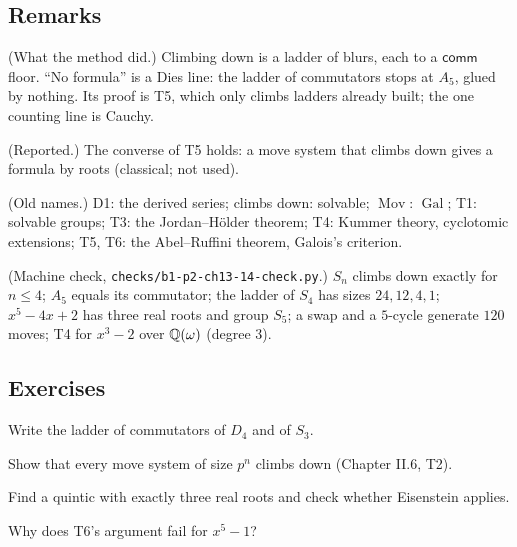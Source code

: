 \subsection*{Remarks}

\begin{lines}
\item[\lab{R1}] (What the method did.) Climbing down is a ladder of blurs, each to a $\mathsf{comm}$ floor. ``No formula'' is a Dies line: the ladder of commutators stops at $A_5$, glued by nothing. Its proof is T5, which only climbs ladders already built; the one counting line is Cauchy.
\item[\lab{R2}] (Reported.) The converse of T5 holds: a move system that climbs down gives a formula by roots (classical; not used).
\item[\lab{R3}] (Old names.) D1: the derived series; climbs down: solvable; $\operatorname{Mov}$: $\operatorname{Gal}$; T1: solvable groups; T3: the Jordan--H\"older theorem; T4: Kummer theory, cyclotomic extensions; T5, T6: the Abel--Ruffini theorem, Galois's criterion.
\item[\lab{R4}] (Machine check, \texttt{checks/b1-p2-ch13-14-check.py}.) $S_n$ climbs down exactly for $n \le 4$; $A_5$ equals its commutator; the ladder of $S_4$ has sizes $24, 12, 4, 1$; $x^5 - 4x + 2$ has three real roots and group $S_5$; a swap and a $5$-cycle generate $120$ moves; T4 for $x^3 - 2$ over $\mathbb{Q}(\omega)$ (degree $3$).
\end{lines}

\subsection*{Exercises}

\begin{lines}
\item[\lab{E1}] Write the ladder of commutators of $D_4$ and of $S_3$.
\item[\lab{E2}] Show that every move system of size $p^n$ climbs down (Chapter II.6, T2).
\item[\lab{E3}] Find a quintic with exactly three real roots and check whether Eisenstein applies.
\item[\lab{E4}] Why does T6's argument fail for $x^5 - 1$?
\end{lines}

\newpage

